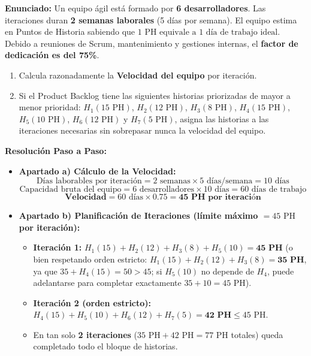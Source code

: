 \begin{ejercicio}
\textbf{Enunciado:} Un equipo ágil está formado por \textbf{6 desarrolladores}. Las iteraciones duran \textbf{2 semanas laborales} (5 días por semana). El equipo estima en Puntos de Historia sabiendo que $1\text{ PH equivale a } 1\text{ día de trabajo ideal}$. Debido a reuniones de Scrum, mantenimiento y gestiones internas, el \textbf{factor de dedicación es del 75\%}.
\begin{enumerate}[label=\textbf{\alph*)}]
    \item Calcula razonadamente la \textbf{Velocidad del equipo} por iteración.
    \item Si el Product Backlog tiene las siguientes historias priorizadas de mayor a menor prioridad: $H_1(15\text{ PH})$, $H_2(12\text{ PH})$, $H_3(8\text{ PH})$, $H_4(15\text{ PH})$, $H_5(10\text{ PH})$, $H_6(12\text{ PH})$ y $H_7(5\text{ PH})$, asigna las historias a las iteraciones necesarias sin sobrepasar nunca la velocidad del equipo.
\end{enumerate}

\textbf{Resolución Paso a Paso:}
\begin{itemize}[itemsep=3pt]
    \item \textbf{Apartado a) Cálculo de la Velocidad:}
    $$\text{Días laborables por iteración} = 2\text{ semanas} \times 5\text{ días/semana} = 10\text{ días}$$
    $$\text{Capacidad bruta del equipo} = 6\text{ desarrolladores} \times 10\text{ días} = 60\text{ días de trabajo}$$
    $$\mathbf{Velocidad} = 60\text{ días} \times 0.75 = \mathbf{45\text{ PH por iteración}}$$
    \item \textbf{Apartado b) Planificación de Iteraciones (límite máximo $= 45\text{ PH}$ por iteración):}
    \begin{itemize}
        \item \textbf{Iteración 1:} $H_1(15) + H_2(12) + H_3(8) + H_5(10) = \mathbf{45\text{ PH}}$ (o bien respetando orden estricto: $H_1(15)+H_2(12)+H_3(8) = \mathbf{35\text{ PH}}$, ya que $35 + H_4(15) = 50 > 45$; si $H_5(10)$ no depende de $H_4$, puede adelantarse para completar exactamente $35+10=45\text{ PH}$).
        \item \textbf{Iteración 2 (orden estricto):} $H_4(15) + H_5(10) + H_6(12) + H_7(5) = \mathbf{42\text{ PH}} \le 45\text{ PH}$.
        \item En tan solo \textbf{2 iteraciones} ($35\text{ PH} + 42\text{ PH} = 77\text{ PH}$ totales) queda completado todo el bloque de historias.
    \end{itemize}
\end{itemize}
\end{ejercicio}

